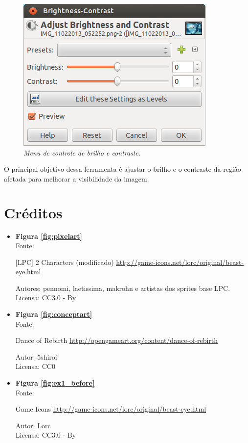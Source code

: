 \documentclass[12pt,onecolumn]{article}
\begin{document}
        \begin{figure}[H]
          \centering
          \includegraphics[width=.6\linewidth]{screenshots/11-brightness_contrast.png}
          \caption{
            \footnotesize
            \it
            Menu de controle de brilho e contraste.
          }
          \label{fig:brightness_contrast}
        \end{figure}
        
        O principal objetivo dessa ferramenta é ajustar o brilho e o contraste
        da região afetada para melhorar a visibilidade da imagem.

\clearpage
\section{Créditos}

  \begin{itemize}
    \item
      \textbf{Figura \ref{fig:pixelart}} \\
      Fonte:
      \begin{center}
        [LPC] 2 Characters (modificado)
        \url{http://game-icons.net/lorc/original/beast-eye.html} \\
      \end{center}
      Autores: pennomi, laetissima, makrohn e artistas dos sprites base LPC. \\
      Licensa: CC3.0 - By
  \end{itemize}
  
  \begin{itemize}
    \item
      \textbf{Figura \ref{fig:conceptart}} \\
      Fonte:
      \begin{center}
        Dance of Rebirth \url{http://opengameart.org/content/dance-of-rebirth} \\
      \end{center}
      Autor: 5shiroi \\
      Licensa: CC0
  \end{itemize}
  
  \begin{itemize}
    \item
      \textbf{Figura \ref{fig:ex1_before}} \\
      Fonte:
      \begin{center}
        Game Icons \url{http://game-icons.net/lorc/original/beast-eye.html} \\
      \end{center}
      Autor: Lorc \\
      Licensa: CC3.0 - By
  \end{itemize}
\end{document}
